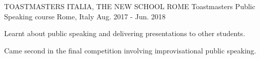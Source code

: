 \begin{cventries}
  \cventry
    {TOASTMASTERS ITALIA, THE NEW SCHOOL ROME} %
    {Toastmasters Public Speaking course} %
    {Rome, Italy} %
    {Aug. 2017 - Jun. 2018} %
    {
      \begin{cvitems} %
        \item {Learnt about public speaking and delivering presentations to other students.}
        \item {Came second in the final competition involving improvisational public speaking.}
      \end{cvitems}
    }
\end{cventries}
